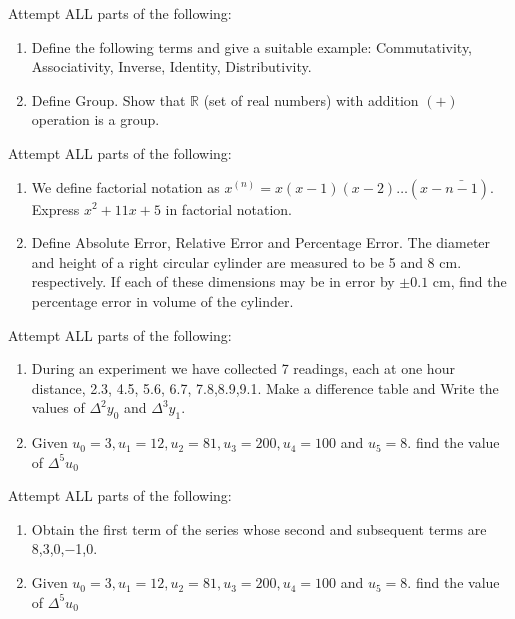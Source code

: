 \documentclass[11pt]{article}
\newcommand{\R}{\mathbb{R}}
\begin{document}
\begin{questions}
\begin{enumerate}
	\end{enumerate}
\vspace{-0.2cm}
\item Attempt ALL parts of the following: 
\begin{enumerate}
\item Define the following terms and give a suitable example: Commutativity, Associativity, Inverse, Identity, Distributivity.
\item Define Group. Show that $\R$ (set of real numbers) with addition $(+)$ operation is a group.
\end{enumerate}
\vspace{-0.2cm}
\item Attempt ALL parts of the following: 
\begin{enumerate}
\item We define factorial notation as  $x^{(n)} = x (x-1)(x-2) \ldots (x-\bar{n-1})$. Express $x^2 + 11x + 5$ in factorial notation.
	\item Define Absolute Error, Relative Error and Percentage Error. The diameter and height of a right circular cylinder are measured to be 5 and
8 cm. respectively. If each of these dimensions may be in error by $\pm 0.1$ cm, find the  percentage error in volume of the cylinder.
\end{enumerate}
\vspace{-0.2cm}
\item Attempt ALL parts of the following: 
\begin{enumerate}
	\item During an experiment we have collected 7 readings, each at one hour distance, 2.3, 4.5, 5.6, 6.7, 7.8,8.9,9.1. Make a difference table and Write the values of $\Delta^2y_0$ and $\Delta^3y_1$.
	\item Given $u_0 = 3, u_1 = 12, u_2 = 81, u_3 = 200, u_4 = 100$ and $u_5 = 8$. find the value of $\Delta^5u_0$
\end{enumerate}
\vspace{-0.2cm}
\item Attempt ALL parts of the following: 
\begin{enumerate}
	\item Obtain the first term of the series whose second and subsequent terms are 8,3,0,−1,0.
		\item Given $u_0 = 3, u_1 = 12, u_2 = 81, u_3 = 200, u_4 = 100$ and $u_5 = 8$. find the value of $\Delta^5u_0$
\end{enumerate}

\end{questions}
\end{document}
